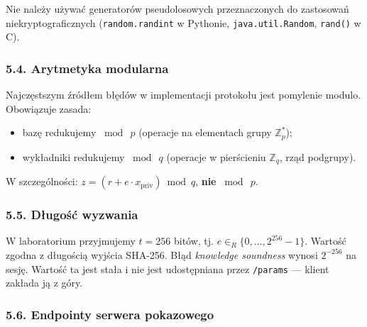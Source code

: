 \documentclass[
]{article}
\providecommand{\tightlist}{%
  \setlength{\itemsep}{0pt}\setlength{\parskip}{0pt}}
\begin{document}
Nie należy używać generatorów pseudolosowych przeznaczonych do
zastosowań niekryptograficznych (\texttt{random.randint} w Pythonie,
\texttt{java.util.Random}, \texttt{rand()} w C).

\subsubsection{5.4. Arytmetyka modularna}\label{arytmetyka-modularna}

Najczęstszym źródłem błędów w implementacji protokołu jest pomylenie
modulo. Obowiązuje zasada:

\begin{itemize}
\tightlist
\item
  bazę redukujemy \(\bmod\ p\) (operacje na elementach grupy
  \(\mathbb{Z}^*_p\));
\item
  wykładniki redukujemy \(\bmod\ q\) (operacje w pierścieniu
  \(\mathbb{Z}_q\), rząd podgrupy).
\end{itemize}

W szczególności: \(z = (r + e \cdot x_{\mathrm{priv}}) \bmod q\),
\textbf{nie} \(\bmod\ p\).

\subsubsection{5.5. Długość
wyzwania}\label{dux142ugoux15bux107-wyzwania}

W laboratorium przyjmujemy \(t = 256\) bitów, tj.
\(e \in_R \{0, \ldots, 2^{256}-1\}\). Wartość zgodna z długością wyjścia
SHA-256. Błąd \emph{knowledge soundness} wynosi \(2^{-256}\) na sesję.
Wartość ta jest stała i nie jest udostępniana przez \texttt{/params} ---
klient zakłada ją z góry.

\subsubsection{5.6. Endpointy serwera
pokazowego}\label{endpointy-serwera-pokazowego}
\end{document}
